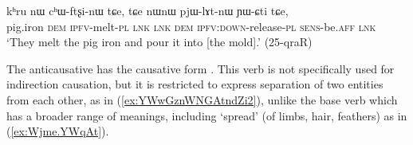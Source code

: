 \begin{exe}
\ex \label{ex:khru.chWftsxinW}
\gll kʰru nɯ cʰɯ-ftʂi-nɯ tɕe, tɕe nɯnɯ pjɯ-lɤt-nɯ ɲɯ-ɕti tɕe, \\
pig.iron \textsc{dem} \textsc{ipfv}-melt-\textsc{pl} \textsc{lnk} \textsc{lnk} \textsc{dem} \textsc{ipfv}:\textsc{down}-release-\textsc{pl} \textsc{sens}-be.\textsc{aff} \textsc{lnk} \\
\glt `They melt the pig iron and pour it into [the mold].' (25-qraR)
\end{exe}

% 

The anticausative  has the causative form . This verb is not specifically used for indirection causation, but it is restricted to express separation of two entities from each other, as in (\ref{ex:YWwGznWNGAtndZi2}), unlike the base verb  which has a broader range of meanings, including `spread' (of limbs, hair, feathers) as in (\ref{ex:Wjme.YWqAt}).

